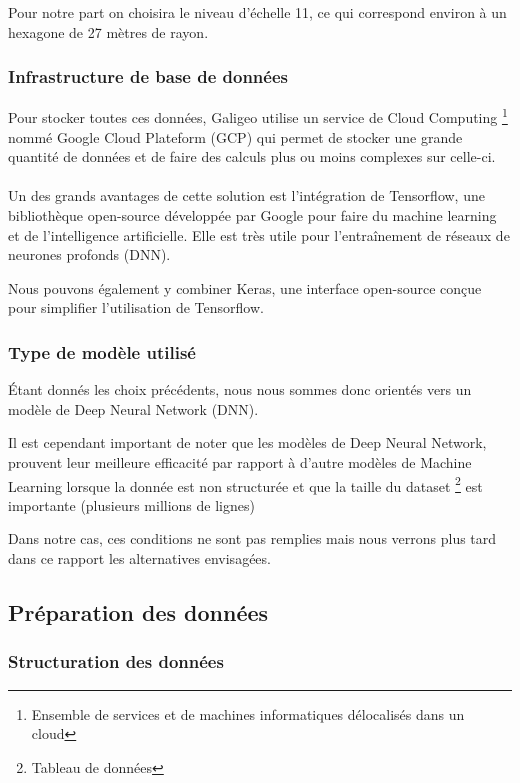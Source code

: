 Pour notre part on choisira le niveau d'échelle 11, ce qui correspond environ à un hexagone de 27 mètres de rayon.

\subsubsection{Infrastructure de base de données}

Pour stocker toutes ces données, Galigeo utilise un service de Cloud Computing \footnote{Ensemble de services et de machines informatiques délocalisés dans un cloud} nommé Google Cloud Plateform (GCP) qui permet de stocker une grande quantité de données et de faire des calculs plus ou moins complexes sur celle-ci.

\paragraph*{}

Un des grands avantages de cette solution est l'intégration de Tensorflow, une bibliothèque open-source développée par Google pour faire du machine learning et de l'intelligence artificielle. Elle est très utile pour l'entraînement de réseaux de neurones profonds (DNN).

Nous pouvons également y combiner Keras, une interface open-source conçue pour simplifier l'utilisation de Tensorflow.


\subsubsection{Type de modèle utilisé}

\'Etant donnés les choix précédents, nous nous sommes donc orientés vers un modèle de Deep Neural Network (DNN).

Il est cependant important de noter que les modèles de Deep Neural Network, prouvent leur meilleure efficacité par rapport à d'autre modèles de Machine Learning lorsque la donnée est non structurée et que la taille du dataset \footnote{Tableau de données} est importante (plusieurs millions de lignes)

Dans notre cas, ces conditions ne sont pas remplies mais nous verrons plus tard dans ce rapport les alternatives envisagées.


\subsection{Préparation des données}

\subsubsection{Structuration des données}

